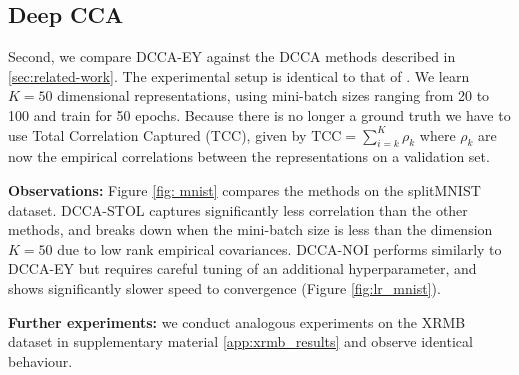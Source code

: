 \subsection{Deep CCA}\label{sec:experiments-DCCA}
Second, we compare DCCA-EY against the DCCA methods described in \cref{sec:related-work}. The experimental setup is identical to that of \cite{wang2015stochastic}.
We learn $K=50$ dimensional representations, using mini-batch sizes ranging from 20 to 100 and train for 50 epochs.
Because there is no longer a ground truth we have to use Total Correlation Captured (TCC), given by \( \text{TCC} = \sum_{i=k}^K \rho_k \) where $\rho_k$ are now the empirical correlations between the representations on a validation set.


\textbf{Observations:}
Figure \ref{fig: mnist} compares the methods on the splitMNIST dataset.
DCCA-STOL captures significantly less correlation than the other methods, and breaks down when the mini-batch size is less than the dimension $K=50$ due to low rank empirical covariances.
DCCA-NOI performs similarly to DCCA-EY but requires careful tuning of an additional hyperparameter, and shows significantly slower speed to convergence (Figure \ref{fig:lr_mnist}).

\textbf{Further experiments:} we conduct analogous experiments on the XRMB dataset in supplementary material \ref{app:xrmb_results} and observe identical behaviour.

